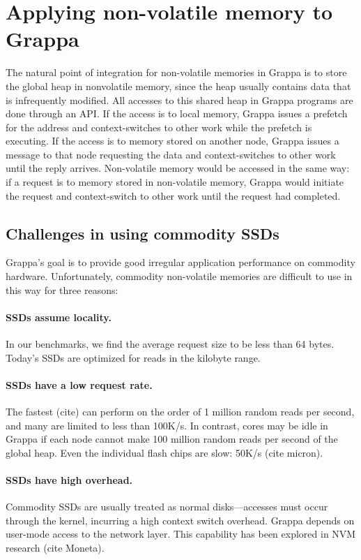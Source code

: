 \section{Applying non-volatile memory to Grappa}
The natural point of integration for non-volatile memories in Grappa
is to store the global heap in nonvolatile memory, since the heap
usually contains data that is infrequently modified. All accesses to
this shared heap in Grappa programs are done through an API. If the
access is to local memory, Grappa issues a prefetch for the address
and context-switches to other work while the prefetch is executing. If
the access is to memory stored on another node, Grappa issues a
message to that node requesting the data and context-switches to other
work until the reply arrives. Non-volatile memory would be accessed in
the same way: if a request is to memory stored in non-volatile memory,
Grappa would initiate the request and context-switch to other work
until the request had completed.

\subsection{Challenges in using commodity SSDs}
Grappa's goal is to provide good irregular application performance on
commodity hardware. Unfortunately, commodity non-volatile memories are
difficult to use in this way for three reasons:

\paragraph{SSDs assume locality.} In our benchmarks, we find the average request size to be
less than 64 bytes. Today's SSDs are optimized for reads in the
kilobyte range.  

\paragraph{SSDs have a low request rate.} The fastest (cite) can
perform on the order of 1 million random reads per second, and many
are limited to less than 100K/s. In contrast, cores may be idle in
Grappa if each node cannot make 100 million random reads per second of
the global heap. Even the individual flash chips are slow: 50K/s (cite
micron).  

\paragraph{SSDs have high overhead.} Commodity SSDs are usually treated
as normal disks---accesses must occur through the kernel, incurring a
high context switch overhead. Grappa depends on user-mode access to
the network layer. This capability has been explored in NVM research
(cite Moneta).  

